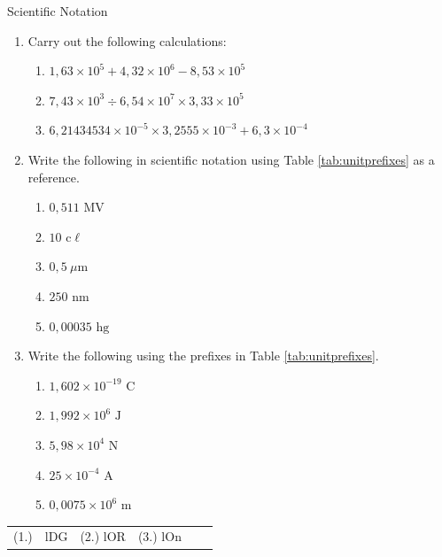 \begin{exercises}{Scientific Notation }
            \nopagebreak \noindent
\begin{enumerate}[noitemsep, label=\textbf{\arabic*}. ] 
 \item Carry out the following calculations:
    \begin{enumerate}[noitemsep, label=\textbf{\alph*}. ] 
     \item $1,63 \times 10^{5} + 4,32 \times 10^{6} - 8,53 \times 10^{5}$
     \item $7,43 \times 10^{3} \div 6,54 \times 10^{7} \times 3,33 \times 10^{5}$
     \item $6,21434534 \times 10^{-5} \times 3,2555 \times 10^{-3} + 6,3 \times 10^{-4}$
    \end{enumerate}
  \item Write the following in scientific notation using Table \ref{tab:unitprefixes} as a reference.
    \begin{enumerate}[noitemsep, label=\textbf{\alph*}. ] 
      \item $0,511 \text{ MV}$
      \item $10 \text{ c}\ell $
      \item $0,5 ~\mu\text{m}$
      \item $250 \text{ nm}$
      \item $0,00035 \text{ hg}$
    \end{enumerate}
  \item Write the following using the prefixes in Table \ref{tab:unitprefixes}.
    \begin{enumerate}[noitemsep, label=\textbf{\alph*}. ] 
      \item $1,602 \times{10}^{-19} \text{ C}$
      \item $1,992 \times{10}^{6} \text { J}$
      \item $5,98 \times{10}^{4} \text{ N}$
      \item $25 \times{10}^{-4} \text{ A}$
      \item $0,0075 \times{10}^{6} \text{ m}$
    \end{enumerate}
\end{enumerate}
\par \practiceinfo
 \par \begin{tabular}[h]{cccccc}
(1.) & lDG & (2.) lOR  &  (3.) lOn  & \end{tabular}
\end{exercises}

